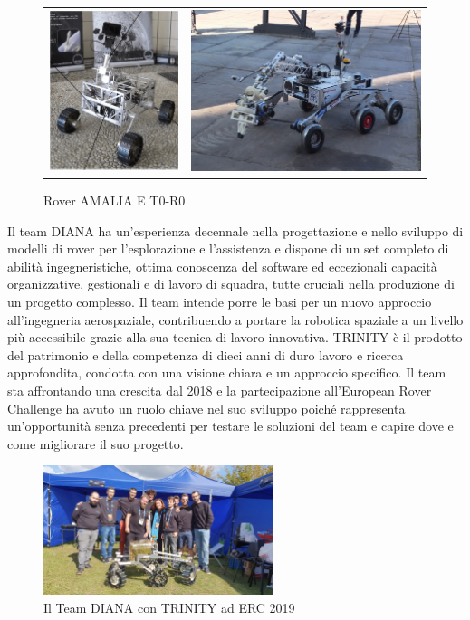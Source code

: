 \documentclass[%
corpo=11pt,
twoside,
 stile=classica,
oldstyle,
greek,%
]{toptesi}
\begin{document}
\begin{figure}
	\centering
	\begin{tabular}{ll}
		\includegraphics[width=.3\textwidth]{image/amalia.png}
&
		\includegraphics[width=.5\textwidth]{image/toro.jpg}
	\end{tabular}
		\caption{Rover AMALIA E T0-R0}
		\label{fig:amaliatoro}
	
\end{figure}

Il team DIANA ha un'esperienza decennale nella progettazione e nello sviluppo di modelli di rover per l'esplorazione e l'assistenza e dispone di un set completo di abilità ingegneristiche, ottima conoscenza del software ed eccezionali capacità organizzative, gestionali e di lavoro di squadra, tutte cruciali nella produzione di un progetto complesso.
Il team intende porre le basi per un nuovo approccio all'ingegneria aerospaziale, contribuendo a portare la robotica spaziale a un livello più accessibile grazie alla sua tecnica di lavoro innovativa.
TRINITY è il prodotto del patrimonio e della competenza di dieci anni di duro lavoro e ricerca approfondita, condotta con una visione chiara e un approccio specifico.
Il team sta affrontando una crescita dal 2018 e la partecipazione all'European Rover Challenge ha avuto un ruolo chiave nel suo sviluppo poiché rappresenta un'opportunità senza precedenti per testare le soluzioni del team e capire dove e come migliorare il suo progetto.

\begin{figure}
	\centering
	\includegraphics[width=0.6\textwidth]{image/trinityerc.jpeg}
	\caption{Il Team DIANA con TRINITY ad ERC 2019}
	\label{fig:trinityerc}
\end{figure}
\end{document}
